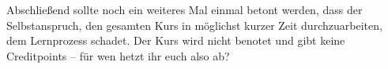 \documentclass{vorkurs}
\begin{document}
Abschließend sollte noch ein weiteres Mal einmal betont werden, dass der
Selbstanspruch, den gesamten Kurs in möglichst kurzer Zeit durchzuarbeiten, dem
Lernprozess schadet. Der Kurs wird nicht benotet und gibt keine Creditpoints --
für wen hetzt ihr euch also ab?

\tableofcontents


\end{document}
